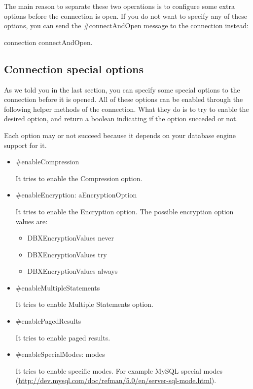 \documentclass[a4paper,10pt,twoside]{book}
\begin{document}
The main reason to separate these two operations is to configure some extra options before the connection is open.  If you do not want to specify any of these options, you can send the \#connectAndOpen message to the connection instead:

\begin{code}{}
connection connectAndOpen.
\end{code}

\subsection{Connection special options}

As we told you in the last section, you can specify some special options to the connection before it is opened.  All of these options can be enabled through the following helper methods of the connection.  What they do is to try to enable the desired option, and return a boolean indicating if the option succeded or not.

Each option may or not succeed because it depends on your database engine support for it.

\begin{itemize}
\item \#enableCompression

It tries to enable the Compression option.

\item \#enableEncryption: aEncryptionOption

It tries to enable the Encryption option.  The possible encryption option values are:
\begin{itemize}
    \item DBXEncryptionValues never
    \item DBXEncryptionValues try
    \item DBXEncryptionValues always
\end{itemize}

\item \#enableMultipleStatements

It tries to enable Multiple Statements option.

\item \#enablePagedResults

It tries to enable paged results.

\item \#enableSpecialModes: modes 

	It tries to enable specific modes. For example MySQL special modes (\url{http://dev.mysql.com/doc/refman/5.0/en/server-sql-mode.html}).

\end{itemize}
\end{document}
